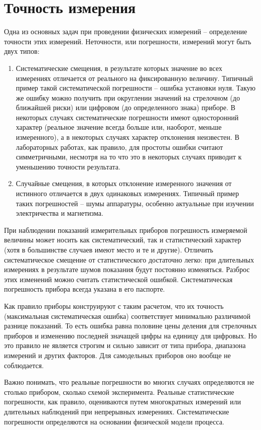 \section{Точность измерения}

Одна из основных задач при проведении физических измерений -- определение точности этих измерений. Неточности, или погрешности, измерений могут быть двух типов:

\begin{enumerate}
	\item Систематические смещения, в результате которых значение во всех измерениях отличается от реального на фиксированную величину. Типичный пример такой систематической погрешности -- ошибка установки нуля. Такую же ошибку можно получить при округлении значений на стрелочном (до ближайшей риски) или цифровом (до определенного знака) приборе. В некоторых случаях систематические погрешности имеют односторонний характер (реальное значение всегда больше или, наоборот, меньше измеренного), а в некоторых случаях характер отклонения неизвестен. В лабораторных работах, как правило, для простоты ошибки считают симметричными, несмотря на то что это в некоторых случаях приводит к уменьшению точности результата.

	\item Случайные смещения, в которых отклонение измеренного значения от истинного отличается в двух одинаковых измерениях. Типичный пример таких погрешностей -- шумы аппаратуры, особенно актуальные при изучении электричества и магнетизма.
\end{enumerate}

При наблюдении показаний измерительных приборов погрешность измеряемой величины может носить как систематический, так и статистический характер (хотя в большинстве случаев имеют место и те и другие). Отличить систематическое смещение от статистического достаточно легко: при длительных измерениях в результате шумов показания будут постоянно изменяться. Разброс этих изменений можно считать статистической ошибкой. Систематическая погрешность прибора всегда указана в его паспорте.

Как правило приборы конструируют с таким расчетом, что их точность (максимальная систематическая ошибка) соответствует минимально различимой разнице показаний. То есть ошибка равна половине цены деления для стрелочных приборов и изменению последней значащей цифры на единицу для цифровых. Но это правило не является строгим и сильно зависит от типа прибора, диапазона измерений и других факторов. Для самодельных приборов оно вообще не соблюдается.

Важно понимать, что реальные погрешности во многих случаях определяются не столько прибором, сколько схемой эксперимента. Реальные статистические погрешности, как правило, оцениваются путем многократных измерений или длительных наблюдений при непрерывных измерениях. Систематические погрешности определяются на основании физической модели процесса.